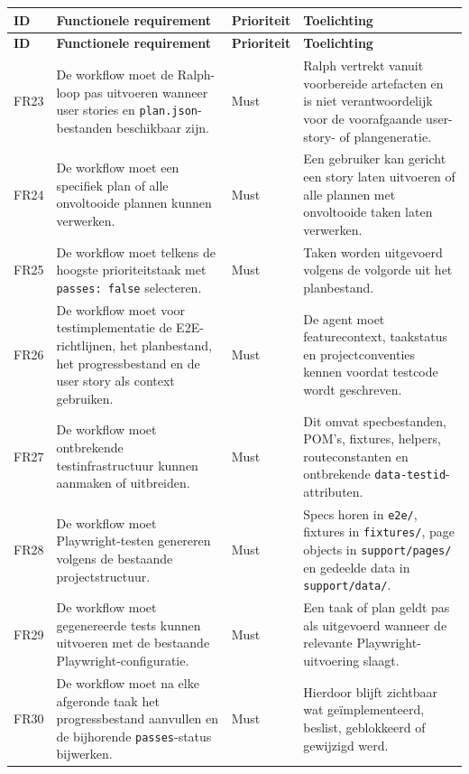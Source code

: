 \begin{longtable}{p{}p{}p{}p{}}
    \toprule
    \textbf{ID} & \textbf{Functionele requirement} & \textbf{Prioriteit} & \textbf{Toelichting} \\
    \midrule
    \endfirsthead
    
    \toprule
    \textbf{ID} & \textbf{Functionele requirement} & \textbf{Prioriteit} & \textbf{Toelichting} \\
    \midrule
    \endhead
    
    FR23 & De workflow moet de Ralph-loop pas uitvoeren wanneer user stories en \texttt{plan.json}-bestanden beschikbaar zijn. & Must & Ralph vertrekt vanuit voorbereide artefacten en is niet verantwoordelijk voor de voorafgaande user-story- of plangeneratie. \\
    \midrule
    FR24 & De workflow moet een specifiek plan of alle onvoltooide plannen kunnen verwerken. & Must & Een gebruiker kan gericht een story laten uitvoeren of alle plannen met onvoltooide taken laten verwerken. \\
    \midrule
    FR25 & De workflow moet telkens de hoogste prioriteitstaak met \texttt{passes: false} selecteren. & Must & Taken worden uitgevoerd volgens de volgorde uit het planbestand. \\
    \midrule
    FR26 & De workflow moet voor testimplementatie de E2E-richtlijnen, het planbestand, het progressbestand en de user story als context gebruiken. & Must & De agent moet featurecontext, taakstatus en projectconventies kennen voordat testcode wordt geschreven. \\
    \midrule
    FR27 & De workflow moet ontbrekende testinfrastructuur kunnen aanmaken of uitbreiden. & Must & Dit omvat specbestanden, POM's, fixtures, helpers, routeconstanten en ontbrekende \texttt{data-testid}-attributen. \\
    \midrule
    FR28 & De workflow moet Playwright-testen genereren volgens de bestaande projectstructuur. & Must & Specs horen in \texttt{e2e/}, fixtures in \texttt{fixtures/}, page objects in \texttt{support/pages/} en gedeelde data in \texttt{support/data/}. \\
    \midrule
    FR29 & De workflow moet gegenereerde tests kunnen uitvoeren met de bestaande Playwright-configuratie. & Must & Een taak of plan geldt pas als uitgevoerd wanneer de relevante Playwright-uitvoering slaagt. \\
    \midrule
    FR30 & De workflow moet na elke afgeronde taak het progressbestand aanvullen en de bijhorende \texttt{passes}-status bijwerken. & Must & Hierdoor blijft zichtbaar wat geïmplementeerd, beslist, geblokkeerd of gewijzigd werd. \\

\end{longtable}
